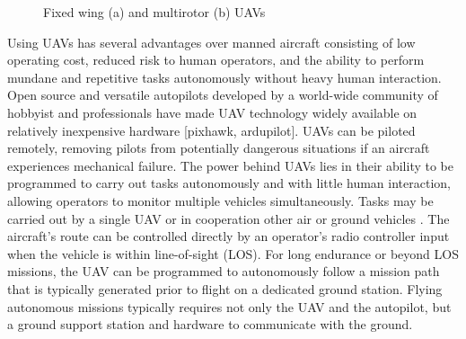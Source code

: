 \documentclass[numbered,pdftex]{ohio-etd}
\begin{document}
\begin{figure}[H]
	\begin{subfigmatrix}{2}%
		\centering	
		\hspace*{0mm}
	\end{subfigmatrix}
	\caption{Fixed wing (a) and multirotor (b) UAVs}
	\label{fig:fixedMultirotor}
\end{figure}

Using UAVs has several advantages over manned aircraft consisting of low operating cost, reduced risk to human operators, and the ability to perform mundane and repetitive tasks autonomously without heavy human interaction. Open source and versatile autopilots developed by a world-wide community of hobbyist and professionals have made UAV technology widely available on relatively inexpensive hardware [pixhawk, ardupilot]. UAVs can be piloted remotely, removing pilots from potentially dangerous situations if an aircraft experiences mechanical failure. The power behind UAVs lies in their ability to be programmed to carry out tasks autonomously and with little human interaction, allowing operators to monitor multiple vehicles simultaneously. Tasks may be carried out by a single UAV or in cooperation other air or ground vehicles \cite{oh_coordinated_2013,hyondong_oh_coordinated_2015,ulun_coordinated_2013}. The aircraft's route can be controlled directly by an operator's radio controller input when the vehicle is within line-of-sight (LOS). For long endurance or beyond LOS missions, the UAV can be programmed to autonomously follow a mission path that is typically generated prior to flight on a dedicated ground station. Flying autonomous missions typically requires not only the UAV and the autopilot, but a ground support station and hardware to communicate with the ground. 
\end{document}
